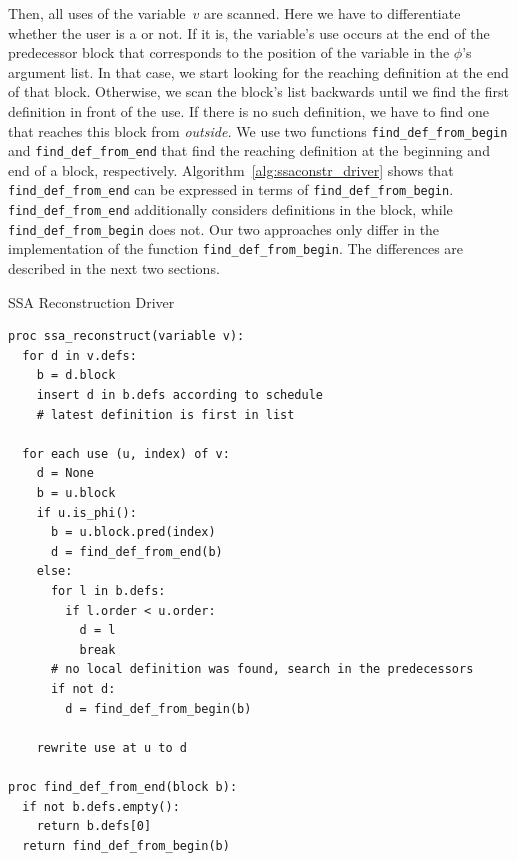 Then, all uses of the variable~$v$ are scanned.
Here we have to differentiate whether the user is a \phifun or not.
If it is, the variable's use occurs at the end of the predecessor block that corresponds to the position of the variable in the $\phi$'s argument list.
In that case, we start looking for the reaching definition at the end of that block.
Otherwise, we scan the block's list backwards until we find the first definition in front of the use.
If there is no such definition, we have to find one that reaches this block from \emph{outside.}
We use two functions \verb|find_def_from_begin| and \verb|find_def_from_end| that find the reaching definition at the beginning and end of a block, respectively. 
Algorithm~\ref{alg:ssaconstr_driver} shows that \verb|find_def_from_end| can be expressed in terms of \verb|find_def_from_begin|. 
\verb|find_def_from_end| additionally considers definitions in the block, while \verb|find_def_from_begin| does not.
Our two approaches only differ in the implementation of the function \verb|find_def_from_begin|.
The differences are described in the next two sections.
\begin{algorithm}
	\caption{SSA Reconstruction Driver}
	\label{alg:ssaconstr_driver}

\begin{verbatim}
proc ssa_reconstruct(variable v):
  for d in v.defs:
    b = d.block
    insert d in b.defs according to schedule
    # latest definition is first in list

  for each use (u, index) of v:
    d = None
    b = u.block
    if u.is_phi():
      b = u.block.pred(index)
      d = find_def_from_end(b)
    else:
      for l in b.defs:
        if l.order < u.order:
          d = l
          break
      # no local definition was found, search in the predecessors
      if not d:
        d = find_def_from_begin(b)

    rewrite use at u to d

proc find_def_from_end(block b):
  if not b.defs.empty():
    return b.defs[0]
  return find_def_from_begin(b)
\end{verbatim}
\end{algorithm}
